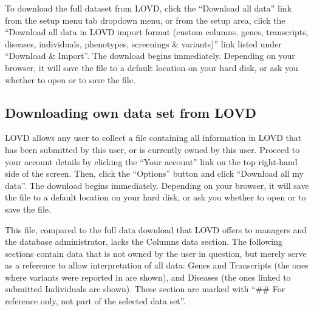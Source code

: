 \documentclass[a4paper,oneside,openany,12pt]{memoir}
\renewenvironment{leftbar}[1][\hsize]
{%
    \def\FrameCommand
    {%
        {\color{LOVDdark}\vrule width 3pt \hspace{5pt}}%
        \colorbox{LOVDlight}%
    }%
    \MakeFramed{\hsize#1\advance\hsize-\width\FrameRestore}%
}
{\endMakeFramed}
\begin{document}
To download the full dataset from LOVD, click the ``Download all data'' link from the setup menu tab dropdown menu, or from the setup area,
 click the ``Download all data in LOVD import format (custom columns, genes, transcripts, diseases, individuals, phenotypes, screenings \& variants)'' link listed under ``Download \& Import''.
The download begins immediately.
Depending on your browser, it will save the file to a default location on your hard disk, or ask you whether to open or to save the file.



\hypertarget{ssec:download_owned_data}{}
\subsection{Downloading own data set from LOVD}
LOVD allows any user to collect a file containing all information in LOVD that has been submitted by this user, or is currently owned by this user.
Proceed to your account details by clicking the ``Your account'' link on the top right-hand side of the screen.
Then, click the ``Options'' button and click ``Download all my data''.
The download begins immediately.
Depending on your browser, it will save the file to a default location on your hard disk, or ask you whether to open or to save the file.

This file, compared to the full data download that LOVD offers to managers and the database administrator, lacks the Columns data section.
The following sections contain data that is not owned by the user in question, but merely serve as a reference to allow interpretation of all data:
 Genes and Transcripts (the ones where variants were reported in are shown), and Diseases (the ones linked to submitted Individuals are shown).
These section are marked with ``\#\# For reference only, not part of the selected data set''.




\hypertarget{ssec:download_gene_data}{}
\end{document}
